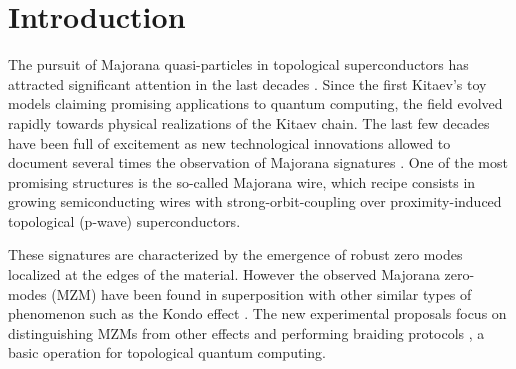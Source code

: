\documentclass[showpacs,aps,prb,reprint,superscriptaddress]{revtex4-1}
\newcommand{\TS}[1]{{$\rightarrow$ {\sl#1}}}
\begin{document}

\maketitle




\maketitle


\section{Introduction}
\label{sec:Intro}


The pursuit of Majorana quasi-particles in topological superconductors has attracted significant attention in the last decades \cite{alicea_new_2012,beenakker_search_2013}.  Since the first Kitaev's toy models \cite{kitaev_unpaired_2001,kitaev_fault-tolerant_2003} claiming promising applications to quantum computing, the field evolved rapidly towards physical realizations of the Kitaev chain.  The last few decades have been full of excitement as new technological innovations  allowed to document several times the observation of Majorana signatures \citep{mourik_signatures_2012,das_zero-bias_2012,deng_anomalous_2012,nadj-perge_observation_2014,deng_majorana_2016,zhang_quantized_2018}. One of the most promising structures is the so-called Majorana wire, which recipe consists in growing semiconducting wires with strong-orbit-coupling over proximity-induced topological (p-wave) superconductors.  

These signatures are characterized by the emergence of robust zero modes localized at the edges of the material. However the observed Majorana zero-modes (MZM) have been found in superposition with other similar types of phenomenon such as the Kondo effect \cite{lee_zero-bias_2012}. The new experimental proposals focus on distinguishing MZMs from other effects and performing braiding protocols \cite{aasen_milestones_2016,sarma_majorana_2015,heck_coulomb-assisted_2012}, a basic operation for topological quantum computing. 
\end{document}
